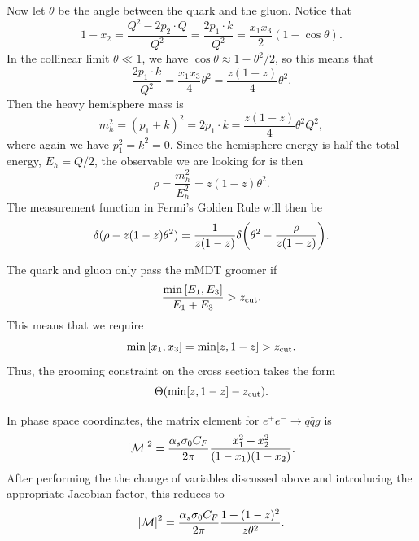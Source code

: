 \documentclass[../thesis.tex]{subfiles}
\providecommand{\zcut}{z_\mathrm{{cut}}}
\providecommand{\cM}{\mathcal{M}}
\begin{document}
	Now let $\theta$ be the angle between the quark and the gluon. Notice that
	\begin{equation}
		1 - x_2 = \frac{Q^2 - 2 p_2 \cdot Q}{Q^2} = \frac{2p_1 \cdot k}{Q^2} = \frac{x_1 x_3}{2}(1 - \cos \theta).
	\end{equation}
	In the collinear limit $\theta \ll 1$, we have $\cos\theta \approx 1 - \theta^2/2$, so this means that
	\begin{equation}
		\frac{2p_1 \cdot k}{Q^2} = \frac{x_1 x_3}{4}\theta^2 = \frac{z(1 - z)}{4}\theta^2.
	\end{equation}
	Then the heavy hemisphere mass is
	\begin{equation}
		m_h^2 = (p_1 + k)^2 = 2 p_1 \cdot k = \frac{z(1 - z)}{4}\theta^2 Q^2,
	\end{equation}
	where again we have $p_1^2 = k^2 = 0$. Since the hemisphere energy is half the total energy, $E_h = Q/2$, the observable we are looking for is then
	\begin{equation}
		\rho = \frac{m_h^2}{E_h^2} = z(1 - z)\theta^2.
	\end{equation}
	The measurement function in Fermi's Golden Rule will then be
	\begin{equation}\label{leading-eq:collinear measurement term}
		\delta(\rho - z(1 - z)\theta^2) = \frac{1}{z(1 - z)}\delta\qty(\theta^2 - \frac{\rho}{z(1 - z)}).
	\end{equation}

	The quark and gluon only pass the mMDT groomer if \cite{kardos_two-_2020}
	\begin{equation}
		\frac{\min\qty[E_1, E_3]}{E_1 + E_3} > \zcut.
	\end{equation}
	This means that we require
	\begin{equation}
		\min\qty[x_1, x_3] = \min[z, 1 - z] > \zcut.
	\end{equation}
	Thus, the grooming constraint on the cross section takes the form
	\begin{equation}\label{leading-eq:collinear grooming term}
		\Theta\qty(\min[z, 1 - z] - \zcut).
	\end{equation}

	In phase space coordinates, the matrix element for $e^+ e^- \to q \bar q g$ is \cite{larkoski_improving_2020}
	\begin{equation}
		\abs{\cM}^2 = \frac{\alpha_s \sigma_0 C_F}{2\pi} \frac{x_1^2 + x_2^2}{(1 - x_1)(1 - x_2)}.
	\end{equation}
	After performing the the change of variables discussed above and introducing the appropriate Jacobian factor, this reduces to
	\begin{equation}
		\abs{\cM}^2 = \frac{\alpha_s \sigma_0 C_F}{2\pi} \frac{1 + (1 - z)^2}{z\theta^2}.
	\end{equation}
\end{document}
